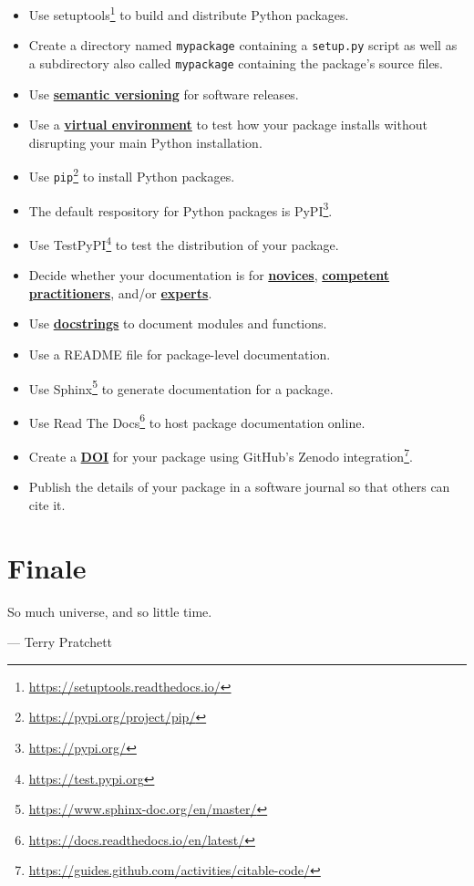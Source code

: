 \documentclass[
]{krantz}
\providecommand{\tightlist}{%
  \setlength{\itemsep}{0pt}\setlength{\parskip}{0pt}}
\renewenvironment{quote}{\begin{VF}}{\end{VF}}
\renewcommand{\href}[2]{#2\footnote{\url{#1}}}
\newcommand{\gref}[2]{\hyperlink{#2}{\textbf{#1}}}
\begin{document}
\begin{itemize}
\tightlist
\item
  Use \href{https://setuptools.readthedocs.io/}{setuptools} to build and distribute Python packages.
\item
  Create a directory named \texttt{mypackage} containing a \texttt{setup.py} script
  as well as a subdirectory also called \texttt{mypackage} containing the package's source files.
\item
  Use \gref{semantic versioning}{semantic\_versioning} for software releases.
\item
  Use a \gref{virtual environment}{virtual\_environment} to test how your package installs
  without disrupting your main Python installation.\\
\item
  Use \href{https://pypi.org/project/pip/}{\texttt{pip}} to install Python packages.
\item
  The default respository for Python packages is \href{https://pypi.org/}{PyPI}.
\item
  Use \href{https://test.pypi.org}{TestPyPI} to test the distribution of your package.
\item
  Decide whether your documentation is for \gref{novices}{novice},
  \gref{competent practitioners}{competent\_practitioner}, and/or \gref{experts}{expert}.
\item
  Use \gref{docstrings}{docstring} to document modules and functions.
\item
  Use a README file for package-level documentation.
\item
  Use \href{https://www.sphinx-doc.org/en/master/}{Sphinx} to generate documentation for a package.
\item
  Use \href{https://docs.readthedocs.io/en/latest/}{Read The Docs} to host package documentation online.
\item
  Create a \gref{DOI}{doi} for your package using \href{https://guides.github.com/activities/citable-code/}{GitHub's Zenodo integration}.
\item
  Publish the details of your package in a software journal so that others can cite it.
\end{itemize}

\hypertarget{finale}{%
\chapter{Finale}\label{finale}}

\begin{quote}
So much universe, and so little time.

--- Terry Pratchett
\end{quote}
\end{document}
